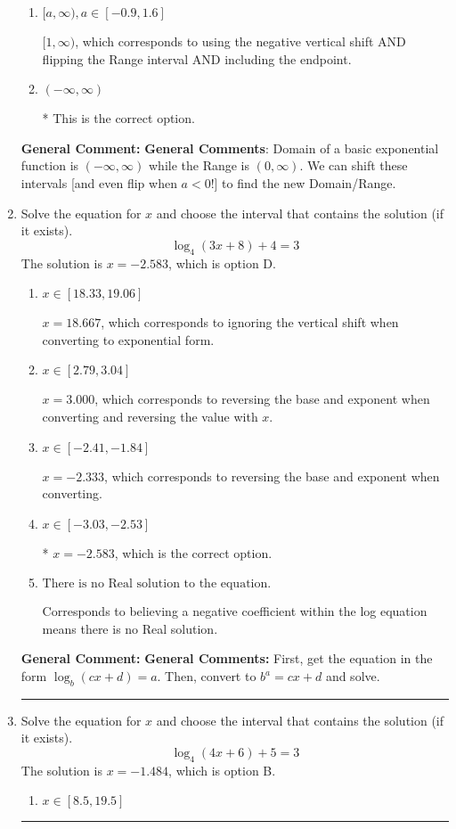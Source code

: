 \documentclass{extbook}[14pt]
\newcommand{\litem}[1]{\item #1

\rule{\textwidth}{0.4pt}}
\begin{document}
\begin{enumerate}
{\begin{enumerate}[label=\Alph*.]
$(-\infty, -1)$, which corresponds to using the correct vertical shift *if we wanted the Range*.
\item \( [a, \infty), a \in [-0.9, 1.6] \)

$[1, \infty)$, which corresponds to using the negative vertical shift AND flipping the Range interval AND including the endpoint.
\item \( (-\infty, \infty) \)

* This is the correct option.
\end{enumerate}

\textbf{General Comment:} \textbf{General Comments}: Domain of a basic exponential function is $(-\infty, \infty)$ while the Range is $(0, \infty)$. We can shift these intervals [and even flip when $a<0$!] to find the new Domain/Range.
}
\litem{
Solve the equation for $x$ and choose the interval that contains the solution (if it exists).
\[ \log_{4}{(3x+8)}+4 = 3 \]The solution is \( x = -2.583 \), which is option D.\begin{enumerate}[label=\Alph*.]
\item \( x \in [18.33, 19.06] \)

$x = 18.667$, which corresponds to ignoring the vertical shift when converting to exponential form.
\item \( x \in [2.79, 3.04] \)

$x = 3.000$, which corresponds to reversing the base and exponent when converting and reversing the value with $x$.
\item \( x \in [-2.41, -1.84] \)

$x = -2.333$, which corresponds to reversing the base and exponent when converting.
\item \( x \in [-3.03, -2.53] \)

* $x = -2.583$, which is the correct option.
\item \( \text{There is no Real solution to the equation.} \)

Corresponds to believing a negative coefficient within the log equation means there is no Real solution.
\end{enumerate}

\textbf{General Comment:} \textbf{General Comments:} First, get the equation in the form $\log_b{(cx+d)} = a$. Then, convert to $b^a = cx+d$ and solve.
}
\litem{
Solve the equation for $x$ and choose the interval that contains the solution (if it exists).
\[ \log_{4}{(4x+6)}+5 = 3 \]The solution is \( x = -1.484 \), which is option B.\begin{enumerate}[label=\Alph*.]
\item \( x \in [8.5, 19.5] \)


\end{enumerate}}
\end{enumerate}
\end{document}
